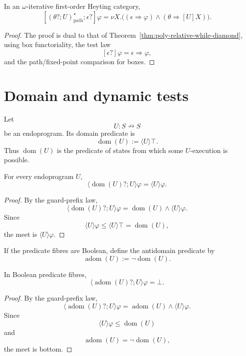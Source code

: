 \begin{theorem}
\label{thm:poly-relative-while-box}
In an \(\omega\)-iterative first-order Heyting category,
\[
\left[
(\theta?;U)^\star_{\mathrm{path}};\epsilon?
\right]\varphi
=
\nu X.\bigl(
(\epsilon\Rightarrow\varphi)
\wedge
(\theta\Rightarrow[U]X)
\bigr).
\]
\end{theorem}

\begin{proof}
The proof is dual to that of
Theorem~\ref{thm:poly-relative-while-diamond}, using box functoriality, the
test law
\[
[\epsilon?]\varphi=\epsilon\Rightarrow\varphi,
\]
and the path/fixed-point comparison for boxes.
\end{proof}

\section{Domain and dynamic tests}
\label{sec:poly-relative-domain-tests}

Let
\[
U:S\nrightarrow S
\]
be an endoprogram.  Its domain predicate is
\[
\operatorname{dom}(U):=\langle U\rangle\top.
\]
Thus \(\operatorname{dom}(U)\) is the predicate of states from which some
\(U\)-execution is possible.

\begin{proposition}
\label{prop:poly-relative-domain-prefix}
For every endoprogram \(U\),
\[
\langle \operatorname{dom}(U)?;U\rangle\varphi
=
\langle U\rangle\varphi.
\]
\end{proposition}

\begin{proof}
By the guard-prefix law,
\[
\langle \operatorname{dom}(U)?;U\rangle\varphi
=
\operatorname{dom}(U)\wedge\langle U\rangle\varphi.
\]
Since
\[
\langle U\rangle\varphi\le \langle U\rangle\top
=
\operatorname{dom}(U),
\]
the meet is \(\langle U\rangle\varphi\).
\end{proof}

If the predicate fibres are Boolean, define the antidomain predicate by
\[
\operatorname{adom}(U):=\neg\operatorname{dom}(U).
\]

\begin{proposition}
\label{prop:poly-relative-antidomain-annihilation}
In Boolean predicate fibres,
\[
\langle \operatorname{adom}(U)?;U\rangle\varphi
=
\bot.
\]
\end{proposition}

\begin{proof}
By the guard-prefix law,
\[
\langle \operatorname{adom}(U)?;U\rangle\varphi
=
\operatorname{adom}(U)\wedge\langle U\rangle\varphi.
\]
Since
\[
\langle U\rangle\varphi\le\operatorname{dom}(U)
\]
and
\[
\operatorname{adom}(U)=\neg\operatorname{dom}(U),
\]
the meet is bottom.
\end{proof}

